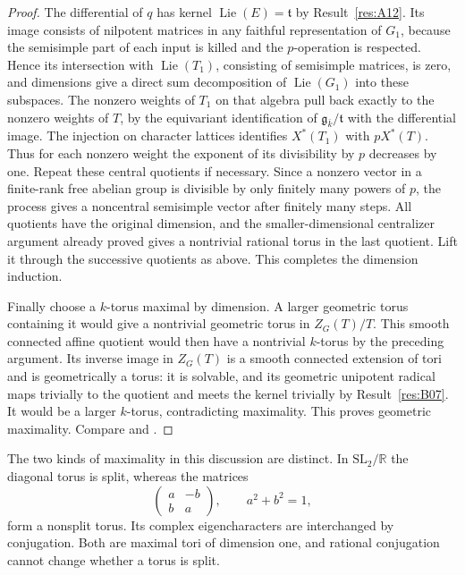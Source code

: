 \documentclass[11pt,a4paper,openany,oneside]{book}
\theoremstyle{resultstyle}
\theoremstyle{definition}
\numberwithin{equation}{chapter}
\newcommand{\SL}{\mathrm{SL}}
\DeclareMathOperator{\Lie}{Lie}
\newcommand{\RR}{\mathbb{R}}
\begin{document}
\begin{proof}
The differential of \(q\) has kernel \(\Lie(E)=\mathfrak t\)
by Result~\ref{res:A12}. Its image consists of nilpotent
matrices in any faithful representation of \(G_1\), because
the semisimple part of each input is killed and the
\(p\)-operation is respected. Hence its intersection with
\(\Lie(T_1)\), consisting of semisimple matrices, is zero,
and dimensions give a direct sum decomposition of
\(\Lie(G_1)\) into these subspaces. The nonzero weights of
\(T_1\) on that algebra pull back exactly to the nonzero
weights of \(T\), by the equivariant identification of
\(\mathfrak g_{\bar k}/\mathfrak t\) with the differential
image. The injection on character lattices identifies
\(X^*(T_1)\) with \(pX^*(T)\). Thus for each nonzero
weight the exponent of its divisibility by \(p\) decreases
by one. Repeat these central quotients if necessary.
Since a nonzero vector in a finite-rank free abelian
group is divisible by only finitely many powers of \(p\),
the process gives a noncentral semisimple vector
after finitely many steps. All quotients have the
original dimension, and the smaller-dimensional
centralizer argument already proved gives a nontrivial
rational torus in the last quotient. Lift it through
the successive quotients as above. This completes the
dimension induction.

Finally choose a \(k\)-torus maximal by dimension.
A larger geometric torus containing it would give a
nontrivial geometric torus in \(Z_G(T)/T\).
This smooth connected affine quotient would then have
a nontrivial \(k\)-torus by the preceding argument.
Its inverse image in \(Z_G(T)\) is a smooth connected
extension of tori and is geometrically a torus:
it is solvable, and its geometric unipotent radical maps
trivially to the quotient and meets the kernel trivially
by Result~\ref{res:B07}. It would be a larger \(k\)-torus,
contradicting maximality. This proves geometric maximality.
Compare \cite[Section 13.3]{springer}
and \cite[Section 17.j]{milne}.
\end{proof}

The two kinds of maximality in this discussion are distinct. In \(\SL_2/\RR\) the diagonal torus is split, whereas the matrices
\[
 \begin{pmatrix}a&-b\\ b&a\end{pmatrix},\qquad a^2+b^2=1,
\]
form a nonsplit torus. Its complex eigencharacters are interchanged by conjugation. Both are maximal tori of dimension one, and rational conjugation cannot change whether a torus is split.
\end{document}
